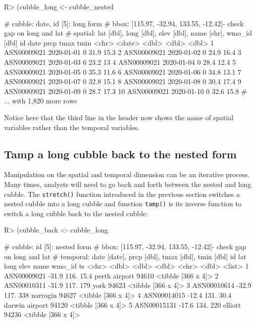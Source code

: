 \documentclass[
]{jss}
\begin{document}
\begin{CodeChunk}
\begin{CodeInput}
R> (cubble_long <- cubble_nested %
\end{CodeInput}
\begin{CodeOutput}
# cubble:  date, id [5]: long form
# bbox:    [115.97, -32.94, 133.55, -12.42]- check gap on long and lat
# spatial: lat [dbl], long [dbl], elev [dbl], name [chr], wmo_id [dbl]
   id          date        prcp  tmax  tmin
   <chr>       <date>     <dbl> <dbl> <dbl>
 1 ASN00009021 2020-01-01     0  31.9  15.3
 2 ASN00009021 2020-01-02     0  24.9  16.4
 3 ASN00009021 2020-01-03     6  23.2  13  
 4 ASN00009021 2020-01-04     0  28.4  12.4
 5 ASN00009021 2020-01-05     0  35.3  11.6
 6 ASN00009021 2020-01-06     0  34.8  13.1
 7 ASN00009021 2020-01-07     0  32.8  15.1
 8 ASN00009021 2020-01-08     0  30.4  17.4
 9 ASN00009021 2020-01-09     0  28.7  17.3
10 ASN00009021 2020-01-10     0  32.6  15.8
# ... with 1,820 more rows
\end{CodeOutput}
\end{CodeChunk}

Notice here that the third line in the header now shows the name of
spatial variables rather than the temporal variables.

\hypertarget{tamp-a-long-cubble-back-to-the-nested-form}{%
\subsection{Tamp a long cubble back to the nested
form}\label{tamp-a-long-cubble-back-to-the-nested-form}}

Manipulation on the spatial and temporal dimension can be an iterative
process. Many times, analysts will need to go back and forth between the
nested and long cubble. The \texttt{stretch()} function introduced in
the previous section switches a nested cubble into a long cubble and
function \texttt{tamp()} is its inverse function to switch a long cubble
back to the nested cubble:

\begin{CodeChunk}
\begin{CodeInput}
R> (cubble_back <- cubble_long %
\end{CodeInput}
\begin{CodeOutput}
# cubble:   id [5]: nested form
# bbox:     [115.97, -32.94, 133.55, -12.42]- check gap on long and lat
# temporal: date [date], prcp [dbl], tmax [dbl], tmin [dbl]
  id            lat  long  elev name           wmo_id ts                
  <chr>       <dbl> <dbl> <dbl> <chr>           <dbl> <list>            
1 ASN00009021 -31.9  116.  15.4 perth airport   94610 <tibble [366 x 4]>
2 ASN00010311 -31.9  117. 179   york            94623 <tibble [366 x 4]>
3 ASN00010614 -32.9  117. 338   narrogin        94627 <tibble [366 x 4]>
4 ASN00014015 -12.4  131.  30.4 darwin airport  94120 <tibble [366 x 4]>
5 ASN00015131 -17.6  134. 220   elliott         94236 <tibble [366 x 4]>
\end{CodeOutput}
\end{CodeChunk}
\end{document}
